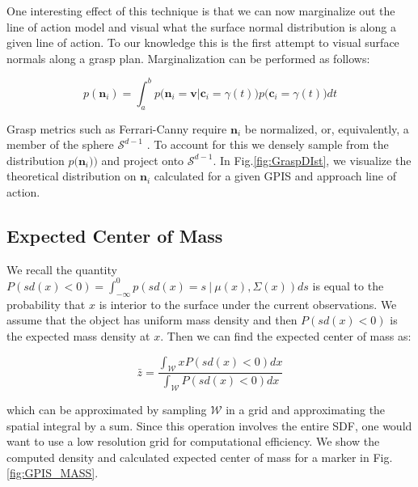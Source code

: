 \documentclass[letterpaper, 10 pt, conference]{ieeeconf}  %
\begin{document}
One interesting effect of this technique is that we can now marginalize out the line of action model and visual what the surface normal distribution is along a given line of action. To our knowledge this is the first attempt to visual surface normals along a grasp plan. Marginalization can be performed as follows:

\vspace{-2ex}
\begin{equation}
p(\textbf{n}_i ) = \int_a^b   p\big(\textbf{n}_i = \textbf{v} | \textbf{c}_i = \gamma(t) \big)p\big(\textbf{c}_i = \gamma(t)\big) dt
\end{equation}

Grasp metrics such as  Ferrari-Canny require $\textbf{n}_i$ be normalized, or, equivalently, a member of the sphere $\mathcal{S}^{d-1}$ \cite{ferrari1992}. To account for this we densely sample from the  distribution $p \big(\textbf{n}_i ) \big)$  and project onto $\mathcal{S}^{d-1}$.  In Fig.\ref{fig:GraspDIst}, we visualize the theoretical distribution on $\textbf{n}_i$ calculated for a given GPIS and approach line of action.


\subsection{Expected Center of Mass}\label{sec:mass} 

We recall the quantity $P(sd(x) < 0) = \int_{-\infty}^{0} p(sd(x) =  s \ | \ \mu(x),\Sigma(x)) ds$ is equal to the probability that $x$ is interior to the surface under the current observations.
We assume that the object has uniform mass density and then $P(sd(x) < 0)$ is the expected mass density at $x$.
Then we can find the expected center of mass as:

\begin{equation}
  \bar{z} 
  =
  \frac
    {\int_{\mathcal{W}}x P(sd(x)<0) dx}
    {\int_{\mathcal{W}}  P(sd(x)<0) dx}
\end{equation}

which can be approximated by sampling $\mathcal{W}$ in a grid and approximating the spatial integral by a sum. Since this operation involves the entire SDF, one would want to use a low resolution grid for computational efficiency. We show the computed density and calculated expected center of mass for a marker in Fig. \ref{fig:GPIS_MASS}.
\end{document}
